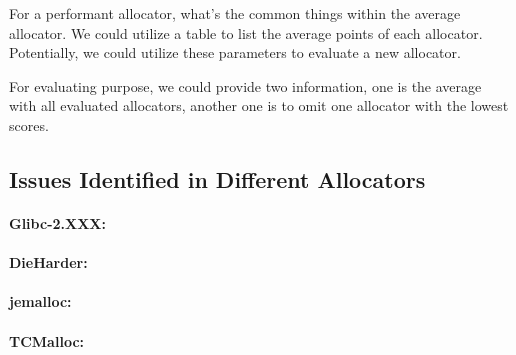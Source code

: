 For a performant allocator, what's the common things within the average allocator. We could utilize a table to list the average points of each allocator. Potentially, we could utilize these parameters to evaluate a new allocator. 

For evaluating purpose, we could provide two information, one is the average with all evaluated allocators, another one is to omit one allocator with the lowest scores. 


\subsection{Issues Identified in Different Allocators}

\paragraph{Glibc-2.XXX:}

\paragraph{DieHarder:}

\paragraph{jemalloc:}

\paragraph{TCMalloc:}

